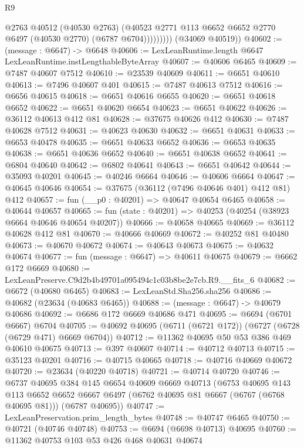 \begin{lexlean}{R9}
\begin{coremodule}
                    @2763
                    @40512
                    (@40530 @2763)
                    (@40523 @2771 @113 @6652 @6652 @2770 @6497 (@40530 @2770) (@6787 @6704)))))))))
      (@34069 @40519))
@40602 := (message : @6647) -> @6648
@40606 := LexLeanRuntime.length @6647 LexLeanRuntime.instLengthableByteArray
@40607 := @40606 @6465
@40609 := @7487 @40607 @7512
@40610 := @23539 @40609
@40611 := @6651 @40610
@40613 := @7496 @40607 @401
@40615 := @7487 @40613 @7512
@40616 := @6656 @40615
@40618 := @6651 @40616 @6655
@40620 := @6651 @40618 @6652
@40622 := @6651 @40620 @6654
@40623 := @6651 @40622
@40626 := @36112 @40613 @412 @81
@40628 := @37675 @40626 @412
@40630 := @7487 @40628 @7512
@40631 := @40623 @40630
@40632 := @6651 @40631
@40633 := @6653 @40478
@40635 := @6651 @40633 @6652
@40636 := @6653 @40635
@40638 := @6651 @40636 @6652
@40640 := @6651 @40638 @6652
@40641 := @6804 @40640
@40642 := @6802 @40641
@40643 := @6651 @40642
@40644 := @35093 @40201
@40645 := @40246 @6664
@40646 := @40606 @6664
@40647 := @40645 @40646
@40654 := @37675 (@36112 (@7496 @40646 @401) @412 @81) @412
@40657 := fun (__p0 : @40201) => @40647 @40654 @6465
@40658 := @40644 @40657
@40665 := fun (state : @40201) => @40253 (@40254 (@38923 @6664 @40646 @40654 @40207))
@40666 := @40658 @40665
@40669 := @36112 @40628 @412 @81
@40670 := @40666 @40669
@40672 := @40252 @81 @40480
@40673 := @40670 @40672
@40674 := @40643 @40673
@40675 := @40632 @40674
@40677 := fun (message : @6647) => @40611 @40675
@40679 := @6662 @172 @6669
@40680 := LexLeanPreserve.C9d2b4b49701a095494c1c03b8be2e7cb.R9.__fits_6
@40682 := @6672 (@40680 @6465)
@40683 := LexLeanStd.Sha256.sha256
@40686 := @40682 (@23634 (@40683 @6465))
@40688 := (message : @6647) -> @40679 @40686
@40692 := @6686 @172 @6669 @40686 @471
@40695 := @6694 (@6701 @6667) @6704
@40705 := @40692 @40695 (@6711 (@6721 @172)) (@6727 (@6728 (@6729 @471) @6669 @6704))
@40712 := @11362 @40695 @50 @53 @386 @469 @40610 @40675
@40713 := @397 @40607
@40714 := @40712 @40713
@40715 := @35123 @40201
@40716 := @40715 @40665
@40718 := @40716 @40669 @40672
@40720 := @23634 (@40220 @40718)
@40721 := @40714 @40720
@40746 := @6737
    @40695
    @384
    @145
    @6654
    @40609
    @6669
    @40713
    (@6753
      @40695
      @143
      @113
      @6652
      @6652
      @6667
      @6497
      (@6762 @40695 @81 @6667 (@6767 (@6768 @40695 @81)))
      (@6787 @40695))
@40747 := LexLeanPreservation.prim_length_bytes
@40748 := @40747 @6465
@40750 := @40721 (@40746 @40748)
@40753 := @6694 (@6698 @40713) @40695
@40760 := @11362 @40753 @103 @53 @426 @468 @40631 @40674

\end{coremodule}
\end{lexlean}
